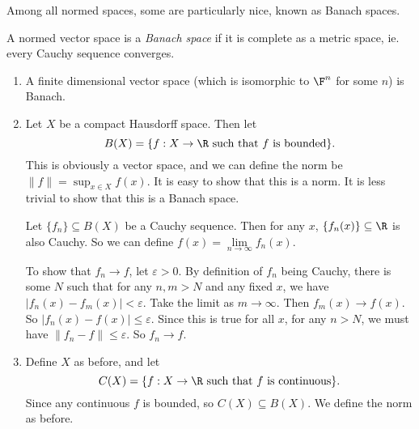 \documentclass[a4paper]{article}
\begin{document}
Among all normed spaces, some are particularly nice, known as Banach spaces.
\begin{defi}
  A normed vector space is a \emph{Banach space} if it is complete as a metric space, ie. every Cauchy sequence converges.
\end{defi}

\begin{eg}\leavevmode
  \begin{enumerate}
    \item A finite dimensional vector space (which is isomorphic to $\F^n$ for some $n$) is Banach.
    \item Let $X$ be a compact Hausdorff space. Then let
      \[
        B(X) = \{f: X\to \R\text{ such that }f\text{ is bounded}\}.
      \]
      This is obviously a vector space, and we can define the norm be $\|f\| = \sup_{x\in X}f(x)$. It is easy to show that this is a norm. It is less trivial to show that this is a Banach space.

      Let $\{f_n\}\subseteq B(X)$ be a Cauchy sequence. Then for any $x$, $\{f_n(x)\}\subseteq \R$ is also Cauchy. So we can define $f(x) = \lim\limits_{n \to \infty}f_n(x)$.

      To show that $f_n \to f$, let $\varepsilon > 0$. By definition of $f_n$ being Cauchy, there is some $N$ such that for any $n, m > N$ and any fixed $x$, we have $|f_n(x) - f_m(x)| < \varepsilon$. Take the limit as $m \to \infty$. Then $f_m(x) \to f(x)$. So  $|f_n(x) - f(x)| \leq \varepsilon$. Since this is true for all $x$, for any $n > N$, we must have $\|f_n - f\| \leq \varepsilon$. So $f_n \to f$.

    \item Define $X$ as before, and let
      \[
        C(X) = \{f: X\to \R\text{ such that }f\text{ is continuous}\}.
      \]
      Since any continuous $f$ is bounded, so $C(X) \subseteq B(X)$. We define the norm as before.


\end{enumerate}
\end{eg}
\end{document}
